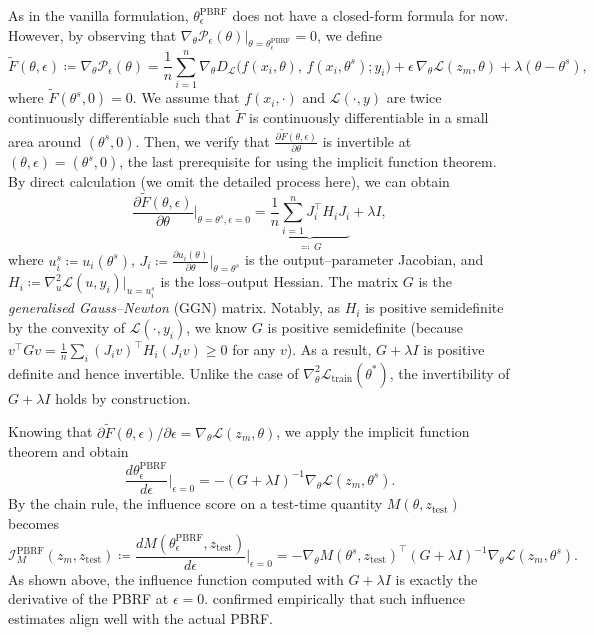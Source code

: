 As in the vanilla formulation, $\theta^{\mathrm{PBRF}}_\epsilon$ does not have a closed-form formula for now. However, by observing that $\nabla_\theta \mathcal{P}_{\epsilon}(\theta)\big|_{\theta=\theta^{\text{PBRF}}_{\epsilon}}=0$, we define
\[
\tilde{F}(\theta, \epsilon)
\coloneqq
\nabla_\theta \mathcal{P}_{\epsilon}(\theta)
=
\frac{1}{n}
\sum_{i=1}^{n}
\nabla_\theta D_{\mathcal{L}}\big(f(x_i, \theta),\, f(x_i, \theta^s); y_i\big)
+
\epsilon\, \nabla_\theta \mathcal{L}(z_m, \theta)
+
\lambda (\theta - \theta^s),
\]
where $\tilde{F}(\theta^s, 0) = 0$. We assume that $f(x_i, \cdot)$ and $\mathcal{L}(\cdot, y)$ are twice continuously differentiable such that $\tilde{F}$ is continuously differentiable in a small area around $(\theta^s, 0)$. Then, we verify that $\frac{\partial\tilde{F}(\theta, \epsilon)}{\partial \theta}$ is invertible at $(\theta, \epsilon) = (\theta^s, 0)$, the last prerequisite for using the implicit function theorem. By direct calculation (we omit the detailed process here), we can obtain
\[
\frac{\partial \tilde{F}(\theta, \epsilon)}{\partial \theta}\bigg|_{\theta = \theta^s, \epsilon = 0}
=
\underbrace{
\frac{1}{n}\sum_{i=1}^{n} J_i^\top H_i J_i
}_{\eqqcolon\, G}
+
\lambda I,
\]
where $u^s_i \coloneqq u_i(\theta^s)$, $J_i \coloneqq \frac{\partial u_i(\theta)}{\partial \theta} \big|_{\theta=\theta^s}$ is the output--parameter Jacobian, and $H_i \coloneqq \nabla^2_u \mathcal{L}(u, y_i) \big|_{u = u^s_i}$ is the loss--output Hessian. The matrix $G$ is the \emph{generalised Gauss--Newton} (GGN) matrix. Notably, as $H_i$ is positive semidefinite by the convexity of $\mathcal{L}(\cdot, y_i)$, we know $G$ is positive semidefinite (because $v^\top G v = \frac{1}{n}\sum_i (J_i v)^\top H_i (J_i v) \geq 0$ for any $v$). As a result, $G + \lambda I$ is positive definite and hence invertible. Unlike the case of $\nabla^2_\theta \mathcal{L}_{\mathrm{train}}(\theta^*)$, the invertibility of $G + \lambda I$ holds by construction.

Knowing that $\partial \tilde{F}(\theta, \epsilon) / \partial \epsilon = \nabla_\theta \mathcal{L}(z_m, \theta)$, we apply the implicit function theorem and obtain
\[
\frac{d\theta^{\mathrm{PBRF}}_{\epsilon}}{d\epsilon}
\Bigg|_{\epsilon=0}
=
-
(G + \lambda I)^{-1}
\nabla_\theta
\mathcal{L}(z_m,\theta^s).
\]
By the chain rule, the influence score on a test-time quantity $M(\theta, z_{\text{test}})$ becomes
\[
\mathcal{I}^{\mathrm{PBRF}}_{M}(z_m, z_{\text{test}})
\coloneqq
\frac{d M(\theta^{\mathrm{PBRF}}_{\epsilon}, z_{\text{test}})}{d\epsilon}
\Bigg|_{\epsilon=0}
=
-
\nabla_\theta M(\theta^s, z_{\text{test}})^\top
(G + \lambda I)^{-1}
\nabla_\theta
\mathcal{L}(z_m,\theta^s).
\]
As shown above, the influence function computed with $G + \lambda I$ is exactly the derivative of the PBRF at $\epsilon = 0$.  confirmed empirically that such influence estimates align well with the actual PBRF.

